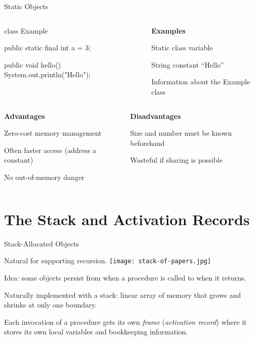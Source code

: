 \documentclass{plt}
\begin{document}
\begin{frame}[fragile]{Static Objects}

\vspace{10pt}
\begin{columns}
\begin{column}{0.6\textwidth}
\begin{java}
class Example {
  public static final int a = 3;

  public void hello() {
    System.out.println("Hello");
  }
}
\end{java}
\end{column}
\begin{column}{0.4\textwidth}
\textbf{Examples}

\baselineskip
Static class variable

String constant ``Hello''

Information about the Example class
\end{column}
\end{columns}

\vspace{\baselineskip}

\begin{columns}[t]
\begin{column}{0.5\textwidth}
\baselineskip
\textbf{Advantages}


Zero-cost memory management

Often faster access (address a constant)

No out-of-memory danger

\end{column}
\begin{column}{0.5\textwidth}
\baselineskip
\textbf{Disadvantages}

Size and number must be known beforehand

Wasteful if sharing is possible
\end{column}
\end{columns}

\end{frame}

\part{The Stack and Activation Records}

\begin{frame}{Stack-Allocated Objects}

Natural for supporting recursion. 
\hfill\texttt{[image: stack-of-papers.jpg]}

Idea: some objects persist from when a procedure is called to
when it returns.

Naturally implemented with a stack: linear array of memory that grows
and shrinks at only one boundary.

Each invocation of a procedure gets its own \emph{frame}
(\emph{activation record}) where it stores its own local variables and
bookkeeping information.

\end{frame}
\end{document}
